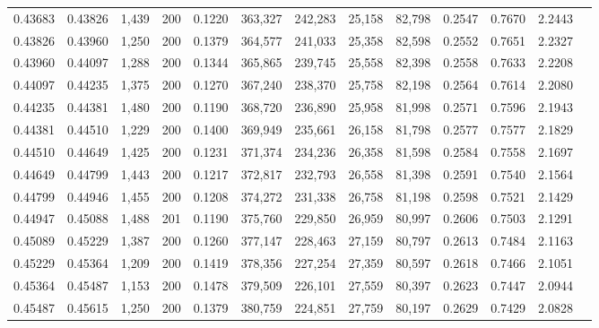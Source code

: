 \begin{tabular}{rrrrrrrrrrrrr}
0.43683 & 0.43826 &  1,439 & 200 &                                     0.1220 & 363,327 & 242,283 &  25,158 &  82,798 & 0.2547 & 0.7670 & 2.2443 \\
0.43826 & 0.43960 &  1,250 & 200 &                                     0.1379 & 364,577 & 241,033 &  25,358 &  82,598 & 0.2552 & 0.7651 & 2.2327 \\
0.43960 & 0.44097 &  1,288 & 200 &                                     0.1344 & 365,865 & 239,745 &  25,558 &  82,398 & 0.2558 & 0.7633 & 2.2208 \\
0.44097 & 0.44235 &  1,375 & 200 &                                     0.1270 & 367,240 & 238,370 &  25,758 &  82,198 & 0.2564 & 0.7614 & 2.2080 \\
0.44235 & 0.44381 &  1,480 & 200 &                                     0.1190 & 368,720 & 236,890 &  25,958 &  81,998 & 0.2571 & 0.7596 & 2.1943 \\
0.44381 & 0.44510 &  1,229 & 200 &                                     0.1400 & 369,949 & 235,661 &  26,158 &  81,798 & 0.2577 & 0.7577 & 2.1829 \\
0.44510 & 0.44649 &  1,425 & 200 &                                     0.1231 & 371,374 & 234,236 &  26,358 &  81,598 & 0.2584 & 0.7558 & 2.1697 \\
0.44649 & 0.44799 &  1,443 & 200 &                                     0.1217 & 372,817 & 232,793 &  26,558 &  81,398 & 0.2591 & 0.7540 & 2.1564 \\
0.44799 & 0.44946 &  1,455 & 200 &                                     0.1208 & 374,272 & 231,338 &  26,758 &  81,198 & 0.2598 & 0.7521 & 2.1429 \\
0.44947 & 0.45088 &  1,488 & 201 &                                     0.1190 & 375,760 & 229,850 &  26,959 &  80,997 & 0.2606 & 0.7503 & 2.1291 \\
0.45089 & 0.45229 &  1,387 & 200 &                                     0.1260 & 377,147 & 228,463 &  27,159 &  80,797 & 0.2613 & 0.7484 & 2.1163 \\
0.45229 & 0.45364 &  1,209 & 200 &                                     0.1419 & 378,356 & 227,254 &  27,359 &  80,597 & 0.2618 & 0.7466 & 2.1051 \\
0.45364 & 0.45487 &  1,153 & 200 &                                     0.1478 & 379,509 & 226,101 &  27,559 &  80,397 & 0.2623 & 0.7447 & 2.0944 \\
0.45487 & 0.45615 &  1,250 & 200 &                                     0.1379 & 380,759 & 224,851 &  27,759 &  80,197 & 0.2629 & 0.7429 & 2.0828 \\

\end{tabular}
